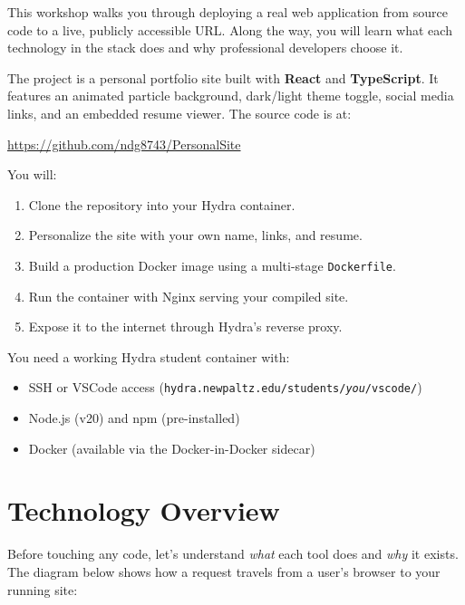 \documentclass[11pt, letterpaper]{article}
\begin{document}
This workshop walks you through deploying a real web application from source
code to a live, publicly accessible URL. Along the way, you will learn what
each technology in the stack does and why professional developers choose it.

The project is a personal portfolio site built with \textbf{React} and
\textbf{TypeScript}. It features an animated particle background, dark/light
theme toggle, social media links, and an embedded resume viewer. The source
code is at:

\begin{center}
\url{https://github.com/ndg8743/PersonalSite}
\end{center}

You will:
\begin{enumerate}
  \item Clone the repository into your Hydra container.
  \item Personalize the site with your own name, links, and resume.
  \item Build a production Docker image using a multi-stage \texttt{Dockerfile}.
  \item Run the container with Nginx serving your compiled site.
  \item Expose it to the internet through Hydra's reverse proxy.
\end{enumerate}

\begin{infobox}[Prerequisites]
You need a working Hydra student container with:
\begin{itemize}[nosep]
  \item SSH or VSCode access (\texttt{hydra.newpaltz.edu/students/\textit{you}/vscode/})
  \item Node.js (v20) and npm (pre-installed)
  \item Docker (available via the Docker-in-Docker sidecar)
\end{itemize}
\end{infobox}

\section{Technology Overview}

Before touching any code, let's understand \textit{what} each tool does and
\textit{why} it exists. The diagram below shows how a request travels from a
user's browser to your running site:
\end{document}
